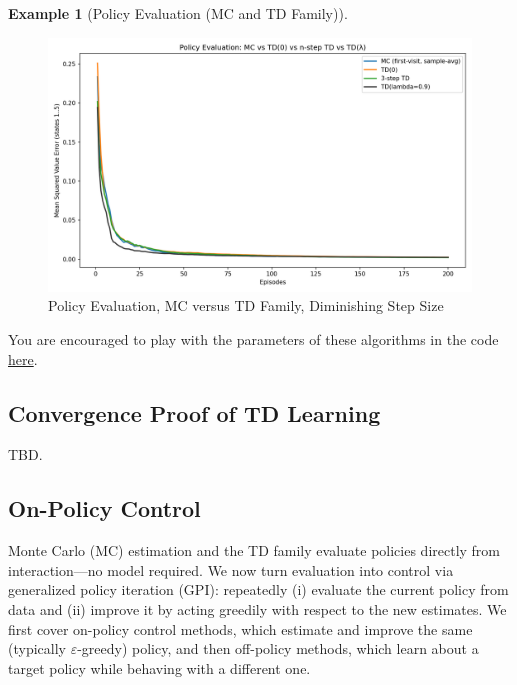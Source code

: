 \documentclass[
]{book}
\theoremstyle{definition}
\theoremstyle{definition}
\newtheorem{example}{Example}[chapter]
\theoremstyle{definition}
\theoremstyle{definition}
\theoremstyle{remark}
\begin{document}
\begin{example}[Policy Evaluation (MC and TD Family)]
\begin{figure}

{\centering \includegraphics[width=0.9\linewidth]{images/Value-RL/mc_td_comparison_diminishing_step} 

}

\caption{Policy Evaluation, MC versus TD Family, Diminishing Step Size}\label{fig:policy-evaluation-random-walk-diminishing-step-size}
\end{figure}

You are encouraged to play with the parameters of these algorithms in the code \href{https://github.com/ComputationalRobotics/2025-ES-AM-158-LECTURE-CODE/blob/main/policy_evaluation_mc_td.py}{here}.
\end{example}

\subsection{Convergence Proof of TD Learning}\label{convergence-proof-of-td-learning}

TBD.

\subsection{On-Policy Control}\label{on-policy-control}

Monte Carlo (MC) estimation and the TD family evaluate policies directly from interaction---no model required. We now turn evaluation into control via generalized policy iteration (GPI): repeatedly (i) evaluate the current policy from data and (ii) improve it by acting greedily with respect to the new estimates. We first cover on-policy control methods, which estimate and improve the same (typically \(\varepsilon\)-greedy) policy, and then off-policy methods, which learn about a target policy while behaving with a different one.
\end{document}

